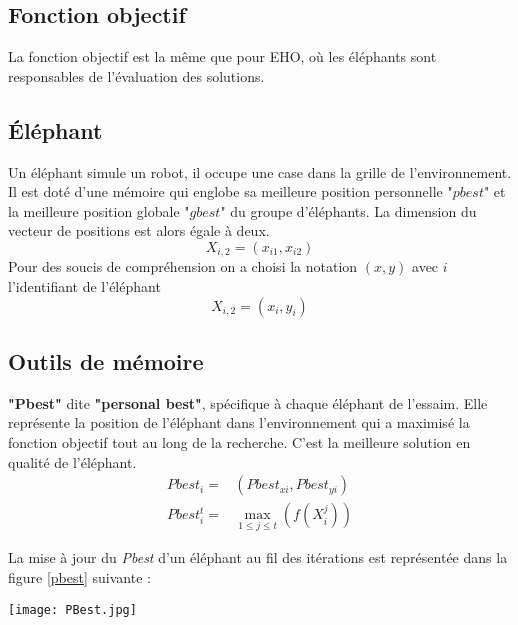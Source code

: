 \subsection{Fonction objectif}
La fonction objectif est la même que pour EHO, où les éléphants sont responsables de l'évaluation des solutions.


\subsection{Éléphant}
Un éléphant simule un robot, il occupe une case dans la grille de l'environnement. Il est doté d'une mémoire qui englobe sa meilleure position personnelle "$pbest$" et la meilleure position globale "$gbest$" du groupe d'éléphants.
La dimension du vecteur de positions est alors égale à deux.
\begin{equation}
X_{i,2} = (x_{i1},x_{i2})
\end{equation}
Pour des soucis de compréhension on a choisi la notation $(x,y)$ avec $i$ l'identifiant de l'éléphant
\begin{equation}
X_{i,2} = (x_{i},y_{i})
\end{equation}

\subsection{Outils de mémoire}
\label{Pbest} \textbf{"Pbest"} dite \textbf{"personal best"}, spécifique à chaque éléphant de l’essaim. Elle représente la position de l’éléphant dans l’environnement qui a maximisé la fonction objectif tout au long de la recherche. C'est la meilleure solution en qualité de l’éléphant.
\begin{equation}
\begin{split}
Pbest_{i}= &(Pbest_{xi},Pbest_{yi})\\
Pbest^{t}_{i}=&\max\limits_{1 \leq j\leq t}(f(X^{j}_{i}))
\end{split}
\end{equation}

La mise à jour du \textit{Pbest} d'un éléphant au fil des itérations est représentée dans la figure \ref{pbest} suivante :
\noindent
\begin{center}	  
	\texttt{[image: PBest.jpg]}%
	\vspace{-0.1 cm}
	\label{pbest}%
\end{center}


